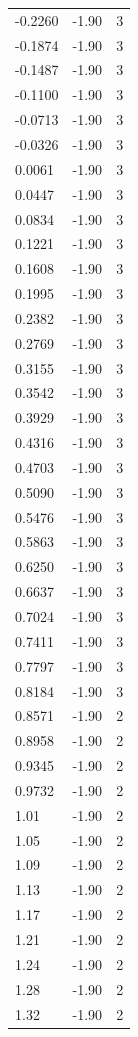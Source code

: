 \begin{longtable}{lrr}
  -0.2260 & -1.90 & 3 \\
  -0.1874 & -1.90 & 3 \\
  -0.1487 & -1.90 & 3 \\
  -0.1100 & -1.90 & 3 \\
  -0.0713 & -1.90 & 3 \\
  -0.0326 & -1.90 & 3 \\
  0.0061 & -1.90 & 3 \\
  0.0447 & -1.90 & 3 \\
  0.0834 & -1.90 & 3 \\
  0.1221 & -1.90 & 3 \\
  0.1608 & -1.90 & 3 \\
  0.1995 & -1.90 & 3 \\
  0.2382 & -1.90 & 3 \\
  0.2769 & -1.90 & 3 \\
  0.3155 & -1.90 & 3 \\
  0.3542 & -1.90 & 3 \\
  0.3929 & -1.90 & 3 \\
  0.4316 & -1.90 & 3 \\
  0.4703 & -1.90 & 3 \\
  0.5090 & -1.90 & 3 \\
  0.5476 & -1.90 & 3 \\
  0.5863 & -1.90 & 3 \\
  0.6250 & -1.90 & 3 \\
  0.6637 & -1.90 & 3 \\
  0.7024 & -1.90 & 3 \\
  0.7411 & -1.90 & 3 \\
  0.7797 & -1.90 & 3 \\
  0.8184 & -1.90 & 3 \\
  0.8571 & -1.90 & 2 \\
  0.8958 & -1.90 & 2 \\
  0.9345 & -1.90 & 2 \\
  0.9732 & -1.90 & 2 \\
  1.01 & -1.90 & 2 \\
  1.05 & -1.90 & 2 \\
  1.09 & -1.90 & 2 \\
  1.13 & -1.90 & 2 \\
  1.17 & -1.90 & 2 \\
  1.21 & -1.90 & 2 \\
  1.24 & -1.90 & 2 \\
  1.28 & -1.90 & 2 \\
  1.32 & -1.90 & 2 \\

\end{longtable}
